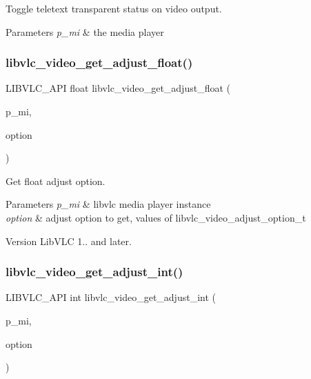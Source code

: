 Toggle teletext transparent status on video output.


\begin{DoxyParams}{Parameters}
{\em p\+\_\+mi} & the media player \\
\hline
\end{DoxyParams}
\mbox{\label{group__libvlc__video_ga6a510bc707485129457fbf0c4759e72f}} 
\subsubsection{\texorpdfstring{libvlc\+\_\+video\+\_\+get\+\_\+adjust\+\_\+float()}{libvlc\_video\_get\_adjust\_float()}}
{\footnotesize\ttfamily L\+I\+B\+V\+L\+C\+\_\+\+A\+PI float libvlc\+\_\+video\+\_\+get\+\_\+adjust\+\_\+float (\begin{DoxyParamCaption}\item[{libvlc\+\_\+media\+\_\+player\+\_\+t $\ast$}]{p\+\_\+mi,  }\item[{unsigned}]{option }\end{DoxyParamCaption})}

Get float adjust option.


\begin{DoxyParams}{Parameters}
{\em p\+\_\+mi} & libvlc media player instance \\
\hline
{\em option} & adjust option to get, values of libvlc\+\_\+video\+\_\+adjust\+\_\+option\+\_\+t \\
\hline
\end{DoxyParams}
\begin{DoxyVersion}{Version}
Lib\+V\+LC 1.. and later. 
\end{DoxyVersion}
\mbox{\label{group__libvlc__video_gac23478339fa8aa0a05fdc0b0e1c320a2}} 
\subsubsection{\texorpdfstring{libvlc\+\_\+video\+\_\+get\+\_\+adjust\+\_\+int()}{libvlc\_video\_get\_adjust\_int()}}
{\footnotesize\ttfamily L\+I\+B\+V\+L\+C\+\_\+\+A\+PI int libvlc\+\_\+video\+\_\+get\+\_\+adjust\+\_\+int (\begin{DoxyParamCaption}\item[{libvlc\+\_\+media\+\_\+player\+\_\+t $\ast$}]{p\+\_\+mi,  }\item[{unsigned}]{option }\end{DoxyParamCaption})}

